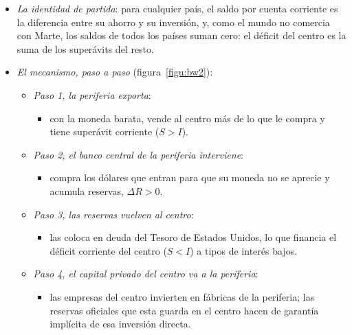 \documentclass[11pt]{article}
\begin{document}
\begin{itemize}
\item \emph{La identidad de partida}: para cualquier país, el saldo por cuenta corriente es la diferencia entre su ahorro y su inversión,
  y, como el mundo no comercia con Marte, los saldos de todos los países suman cero: el déficit del centro es la suma de los superávits del resto.
\item \emph{El mecanismo, paso a paso} (figura~\ref{figu:bw2}):
  \begin{itemize}
  \item \emph{Paso 1, la periferia exporta}:
    \begin{itemize}
    \item con la moneda barata, vende al centro más de lo que le compra y tiene superávit corriente ($S>I$).
    \end{itemize}
  \item \emph{Paso 2, el banco central de la periferia interviene}:
    \begin{itemize}
    \item compra los dólares que entran para que su moneda no se aprecie y acumula reservas, $\Delta R>0$.
    \end{itemize}
  \item \emph{Paso 3, las reservas vuelven al centro}:
    \begin{itemize}
    \item las coloca en deuda del Tesoro de Estados Unidos, lo que financia el déficit corriente del centro ($S<I$) a tipos de interés bajos.
    \end{itemize}
  \item \emph{Paso 4, el capital privado del centro va a la periferia}:
    \begin{itemize}
    \item las empresas del centro invierten en fábricas de la periferia; las reservas oficiales que esta guarda en el centro hacen de garantía implícita de esa inversión directa.
    \end{itemize}
  \end{itemize}
\end{itemize}

\begin{infografia}[H]
\centering
\caption{Bretton Woods II: el circuito entre el centro y la periferia}\label{figu:bw2}
\end{infografia}
\end{document}
